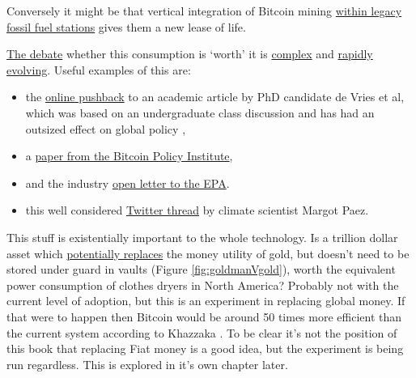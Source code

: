 Conversely it might be that vertical integration of Bitcoin mining \href{https://bitcoinmagazine.com/business/oil-companies-partner-with-bitcoin-miners}{within legacy fossil fuel stations} gives them a new lease of life.\par%
\href{https://www.youtube.com/watch?v=6LP8G-oZnEs}{The debate} whether this consumption is `worth' it is \href{https://www.utilitydive.com/news/bitcoin-mining-as-a-grid-resource-its-complicated/617896/}{complex} and \href{https://www.aei.org/technology-and-innovation/no-hearing-on-bitcoins-energy-use-is-complete-without-nic-carter/}{rapidly evolving}. Useful examples of this are:
\begin{itemize}
\item the \href{https://www.zerohedge.com/crypto/questionable-ethics-anti-bitcoin-esg-junk-science}{online pushback} to an academic article by PhD candidate de Vries et al, which was based on an undergraduate class discussion and has had an outsized effect on global policy \cite{de2022revisiting}, 
\item a \href{https://rebrand.ly/v8qq1sx}{paper from the Bitcoin Policy Institute}, 
\item and the industry \href{https://bitcoinminingcouncil.com/wp-content/uploads/2022/05/Bitcoin_Letter_to_the_Environmental_Protection_Agency.pdf}{open letter to the EPA}.\par
\item this well considered \href{https://twitter.com/jyn_urso/status/1508899761319038983}{Twitter thread} by climate scientist Margot Paez.
\end{itemize}
This stuff is existentially important to the whole technology. Is a trillion dollar asset which \href{https://www.theheldreport.com/p/bitcoin-vs-gold}{potentially replaces} the money utility of gold, but doesn't need to be stored under guard in vaults (Figure \ref{fig:goldmanVgold}), worth the equivalent power consumption of clothes dryers in North America? Probably not with the current level of adoption, but this is an experiment in replacing global money. If that were to happen then Bitcoin would be around 50 times more efficient than the current system according to Khazzaka \cite{khazzaka2022bitcoin}. To be clear it's not the position of this book that replacing Fiat money is a good idea, but the experiment is being run regardless. This is explored in it's own chapter later.\par
